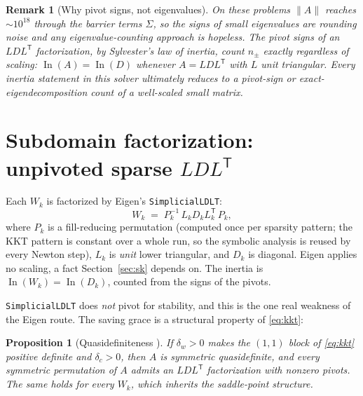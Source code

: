 \documentclass[11pt]{article}
\newtheorem{proposition}{Proposition}
\newtheorem{remark}{Remark}
\newcommand{\In}{\operatorname{In}}
\newcommand{\code}[1]{\texttt{#1}}
\begin{document}
\begin{remark}[Why pivot signs, not eigenvalues]
On these problems $\|A\|$ reaches $\sim\!10^{18}$ through the barrier terms
$\Sigma$, so the \emph{signs of small eigenvalues} are rounding noise and any
eigenvalue-counting approach is hopeless.  The pivot signs of an
$LDL^{\mathsf T}$ factorization, by Sylvester's law of inertia, count
$n_\pm$ exactly regardless of scaling: $\In(A) = \In(D)$ whenever
$A = LDL^{\mathsf T}$ with $L$ unit triangular.  Every inertia statement in
this solver ultimately reduces to a pivot-sign or exact-eigendecomposition
count of a \emph{well-scaled small} matrix.
\end{remark}

\section{Subdomain factorization: unpivoted sparse \texorpdfstring{$LDL^{\mathsf T}$}{LDLT}}
\label{sec:ldlt}

Each $W_k$ is factorized by Eigen's \code{SimplicialLDLT}:
\begin{equation}
  W_k \;=\; P_k^{-1}\, L_k D_k L_k^{\mathsf T}\, P_k ,
  \label{eq:ldlt}
\end{equation}
where $P_k$ is a fill-reducing permutation (computed once per sparsity
pattern; the KKT pattern is constant over a whole run, so the symbolic
analysis is reused by every Newton step), $L_k$ is \emph{unit} lower
triangular, and $D_k$ is diagonal.  Eigen applies no scaling, a fact
Section~\ref{sec:sk} depends on.  The inertia is
$\In(W_k) = \In(D_k)$, counted from the signs of the pivots.

\code{SimplicialLDLT} does \emph{not} pivot for stability, and this is the
one real weakness of the Eigen route.  The saving grace is a structural
property of \eqref{eq:kkt}:

\begin{proposition}[Quasidefiniteness \cite{vanderbei1995symmetric}]
If $\delta_w > 0$ makes the $(1,1)$ block of \eqref{eq:kkt} positive definite
and $\delta_c > 0$, then $A$ is symmetric quasidefinite, and \emph{every}
symmetric permutation of $A$ admits an $LDL^{\mathsf T}$ factorization with
nonzero pivots.  The same holds for every $W_k$, which inherits the
saddle-point structure.
\end{proposition}
\end{document}
